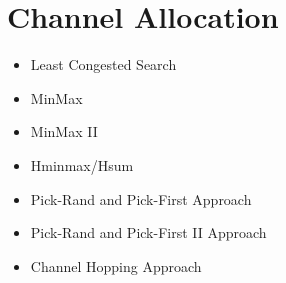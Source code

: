 \chapter{Channel Allocation}

\begin{itemize}
\item Least Congested Search
\item MinMax
\item MinMax II
\item Hminmax/Hsum
\item Pick-Rand and Pick-First Approach
\item Pick-Rand and Pick-First II Approach
\item Channel Hopping Approach
\end{itemize}
